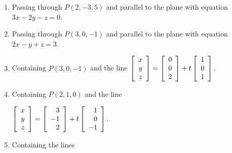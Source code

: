 \begin{multicols}{2}
\begin{ex}
\begin{enumerate}[label={\alph*.}]
\item Passing through $P(2, -3, 5)$ and parallel to the plane with equation $3x - 2y - z = 0$.

\item Passing through $P(3, 0, -1)$ and parallel to the plane with equation $2x - y + z = 3$.

\item Containing $P(3, 0, -1)$ and the line
\newline $\left[
\begin{array}{r}
x\\
y\\
z
\end{array}
\right]
=
\left[
\begin{array}{r}
0\\
0\\
2
\end{array}
\right]
+t
\left[
\begin{array}{r}
1\\
0\\
1
\end{array}
\right].
$
\item Containing $P(2, 1, 0)$ and the line

$
\left[
\begin{array}{r}
x\\
y\\
z
\end{array}
\right]
=
\left[
\begin{array}{r}
3\\
-1\\
2
\end{array}
\right]
+t
\left[
\begin{array}{r}
1\\
0\\
-1
\end{array}
\right].$
\item Containing the lines


\end{enumerate}
\end{ex}
\end{multicols}
